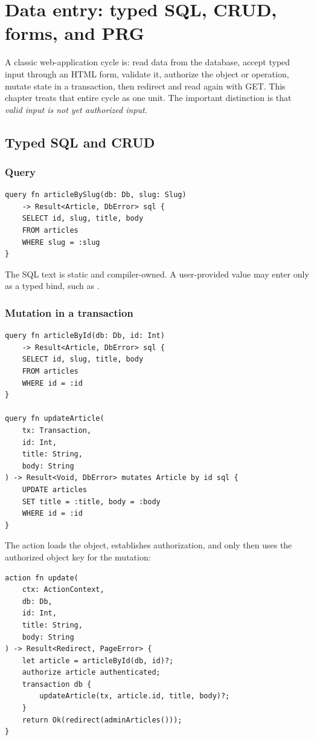\chapter{Data entry: typed SQL, CRUD, forms, and PRG}

A classic web-application cycle is: read data from the database, accept typed input through an HTML form, validate it, authorize the object or operation, mutate state in a transaction, then redirect and read again with GET. This chapter treats that entire cycle as one unit. The important distinction is that \emph{valid input is not yet authorized input}.

\section{Typed SQL and CRUD}

\subsection*{Query}

\begin{lstlisting}[language=RWLang]
query fn articleBySlug(db: Db, slug: Slug)
    -> Result<Article, DbError> sql {
    SELECT id, slug, title, body
    FROM articles
    WHERE slug = :slug
}
\end{lstlisting}

The SQL text is static and compiler-owned. A user-provided value may enter only as a typed bind, such as .

\subsection*{Mutation in a transaction}

\begin{lstlisting}[language=RWLang]
query fn articleById(db: Db, id: Int)
    -> Result<Article, DbError> sql {
    SELECT id, slug, title, body
    FROM articles
    WHERE id = :id
}

query fn updateArticle(
    tx: Transaction,
    id: Int,
    title: String,
    body: String
) -> Result<Void, DbError> mutates Article by id sql {
    UPDATE articles
    SET title = :title, body = :body
    WHERE id = :id
}
\end{lstlisting}

The action loads the object, establishes authorization, and only then uses the authorized object key for the mutation:

\begin{lstlisting}[language=RWLang]
action fn update(
    ctx: ActionContext,
    db: Db,
    id: Int,
    title: String,
    body: String
) -> Result<Redirect, PageError> {
    let article = articleById(db, id)?;
    authorize article authenticated;
    transaction db {
        updateArticle(tx, article.id, title, body)?;
    }
    return Ok(redirect(adminArticles()));
}
\end{lstlisting}

